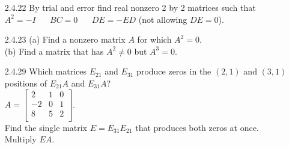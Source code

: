 \documentclass[10pt,twoside,reqno]{article}
\begin{document}
\begin{enumerate}
\hspace{15pt}(a) If $A^2$ is defined then $A$ is necessarily square. \\
\hspace{15pt}(b) If $AB$ and $BA$ are defined then $A$ and $B$ are square. \\
\hspace{15pt}(c) If $AB$ and $BA$ are defined then $AB$ and $BA$ are square. \\
\hspace{15pt}(d) If $A B = B$ then $A = I$. \\
\vspace{3mm}
\item[2.4.22]By trial and error find real nonzero 2 by 2 matrices such that \\
\vspace{3mm}
\hspace{35pt}
$ A^2=-I \hspace{20pt} BC=0 \hspace{20pt} DE = -ED$ (not allowing $DE = 0$). 
\vspace{3mm}
\item[2.4.23]\hspace{10pt}(a) Find a nonzero matrix $A$ for which $A^2=0$. \\
\hspace{10pt}(b) Find a matrix that has $A^2 \neq 0$ but $A^3 = 0$. \\
\vspace{3mm}
\item[2.4.29]Which matrices $E_{21}$ and $E_{31}$ produce zeros in the $(2, 1)$ and $(3, 1)$ positions of $E_{21} A$ and $E_{31}A$? \\
\vspace{3mm}
\hspace{162pt}
$
$$
A=
\begin{bmatrix}
2&1&0 \\
-2&0&1 \\
8&5&2 \\
\end{bmatrix}
$$
$. \\
\vspace{3mm}
Find the single matrix $E = E_{31} E_{21}$ that produces both zeros at once. Multiply $EA$. 
\vspace{3mm}
\end{enumerate}
\end{document}
